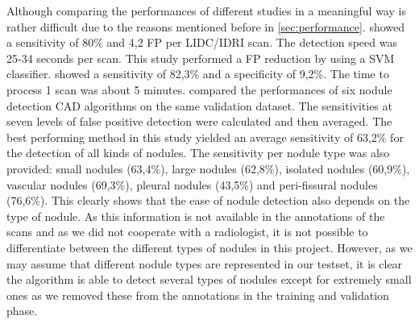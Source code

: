 Although comparing the performances of different studies in a meaningful way is
rather difficult due to the reasons mentioned before in \ref{sec:performance}.
\cite{teramoto} showed a sensitivity of 80\% and 4,2 FP per LIDC/IDRI scan.
The detection speed was 25-34 seconds per scan. This study performed a FP reduction
by using a SVM classifier. \cite{elbaz} showed a sensitivity of 82,3\% and a
specificity of 9,2\%. The time to process 1 scan was about 5 minutes.
\cite{ginneken} compared the performances of six nodule detection CAD algorithms
on the same validation dataset. The sensitivities at seven levels of false
positive detection were calculated and then averaged. The best performing method
in this study yielded an average sensitivity of 63,2\% for the detection of all
kinds of nodules. The sensitivity per nodule type was also provided: small
nodules (63,4\%), large nodules (62,8\%), isolated nodules (60,9\%), vascular
nodules (69,3\%), pleural nodules (43,5\%) and peri-fissural nodules (76,6\%).
This clearly shows that the ease of nodule detection also depends on the type of
nodule. As this information is not available in the annotations of the scans and
as we did not cooperate with a radiologist, it is not possible to differentiate
between the different types of nodules in this project. However, as we may
assume that different nodule types are represented in our testset, it is clear
the algorithm is able to detect several types of nodules except for extremely
small ones as we removed these from the annotations in the training and
validation phase.


